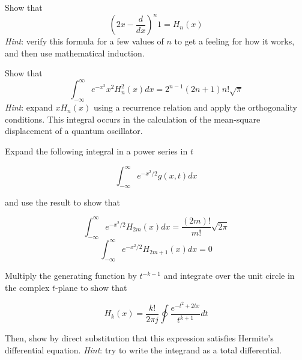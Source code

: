 \begin{sidebar}
\begin{ex}
Show that 
$$\left( 2x - \frac{d}{dx} \right)^n 1 = H_n(x)$$
\emph{Hint}: verify this formula for a few values of $n$ to get a feeling for how it works, and then use mathematical induction.
\end{ex}
\end{sidebar}

\begin{sidebar}
\begin{ex}
Show that
$$ \int_{-\infty}^{\infty} e^{-x^2} x^2 H_n^2(x) dx = 2^{n-1} (2n + 1) n! \sqrt{\pi} $$
\emph{Hint}: expand $x H_n(x)$ using a recurrence relation and apply the orthogonality conditions.
This integral occurs in the calculation of the mean-square displacement of a quantum oscillator.
\end{ex}
\end{sidebar}

\begin{sidebar}
\begin{ex}
Expand the following integral in a power series in $t$

$$ \int_{-\infty}^{\infty} e^{-x^2/2} g(x,t) dx$$

and use the result to show that

$$\int_{-\infty}^{\infty} e^{-x^2/2} H_{2m}(x) dx = \frac{(2m)!}{m!} \sqrt{2\pi} $$
$$\int_{-\infty}^{\infty} e^{-x^2/2} H_{2m+1}(x) dx = 0 $$
\end{ex}
\end{sidebar}


\begin{sidebar}
\begin{ex}
Multiply the generating function by $t^{-k-1}$ and integrate over the unit circle in the complex $t$-plane to show that

$$H_k(x) =\frac{k!}{2 \pi j} \oint \frac{e^{-t^2 +2tx}}{t^{k+1}}dt $$

Then, show by direct substitution that this expression satisfies Hermite's differential equation. \emph{Hint}: try to write the integrand as a total differential.
\end{ex}
\end{sidebar}

